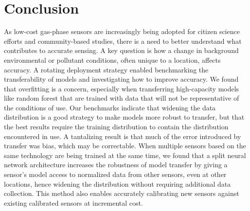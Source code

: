 \documentclass[journal abbreviation, manuscript]{copernicus}
\newcommand\todo[1]{\textcolor{red}{#1}}
\begin{document}


%

\section{Conclusion}

As low-cost gas-phase sensors are increasingly being adopted for citizen science efforts and community-based studies, there is a need to better understand what contributes to accurate sensing.  A key question is how a change in background environmental or pollutant conditions, often unique to a location, affects accuracy.  A rotating deployment strategy enabled benchmarking the transferability of models and investigating how to improve accuracy. We found that overfitting is a concern, especially when transferring high-capacity models like random forest that are trained with data that will not be representative of the conditions of use. Our benchmarks indicate that widening the data distribution is a good strategy to make models more robust to transfer, but that the best results require the training distribution to contain the distribution encountered in use.  A tantalizing result is that much of the error introduced by transfer was bias, which may be correctable.  When multiple sensors based on the same technology are being trained at the same time, we found that a split neural network architecture increases the robustness of model transfer by giving a sensor's model access to normalized data from other sensors, even at other locations, hence widening the distribution without requiring additional data collection.  This method also enables accurately calibrating new sensors against existing calibrated sensors at incremental cost.
\end{document}
